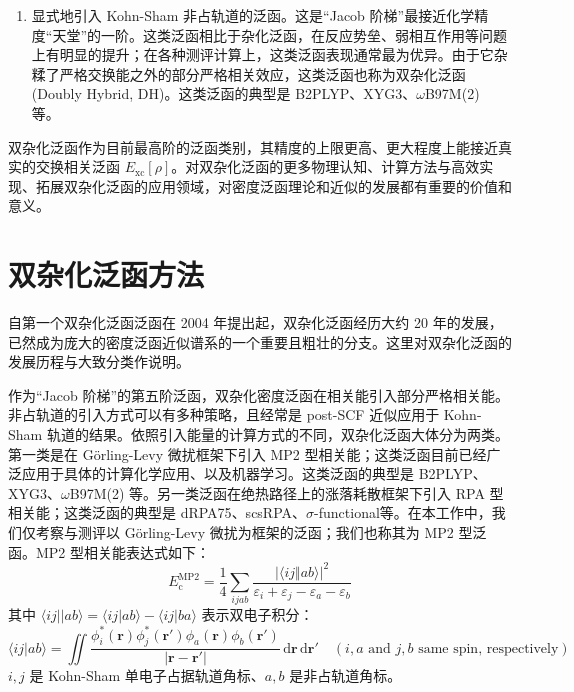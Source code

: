 \begin{enumerate}[nosep]
  \item 显式地引入 Kohn-Sham 非占轨道的泛函。这是“Jacob 阶梯”最接近化学精度“天堂”的一阶。这类泛函相比于杂化泛函，在反应势垒、弱相互作用等问题上有明显的提升；在各种测评计算上，这类泛函表现通常最为优异。由于它杂糅了严格交换能之外的部分严格相关效应，这类泛函也称为双杂化泛函 (Doubly Hybrid, DH)。这类泛函的典型是 B2PLYP\cite{Grimme-Grimme.JCP.2006}、XYG3\cite{Zhang-Goddard.PNAS.2009}、$\omega$B97M(2)\cite{Mardirossian-Head-Gordon.JCP.2018} 等。
\end{enumerate}

双杂化泛函作为目前最高阶的泛函类别，其精度的上限更高、更大程度上能接近真实的交换相关泛函 $E_\mathrm{xc}[\rho]$。对双杂化泛函的更多物理认知、计算方法与高效实现、拓展双杂化泛函的应用领域，对密度泛函理论和近似的发展都有重要的价值和意义。

\section{双杂化泛函方法}

自第一个双杂化泛函泛函在 2004 年提出起\cite{Zhao-Truhlar.JPCA.2004}，双杂化泛函经历大约 20 年的发展，已然成为庞大的密度泛函近似谱系的一个重要且粗壮的分支。这里对双杂化泛函的发展历程与大致分类作说明。

作为“Jacob 阶梯”的第五阶泛函，双杂化密度泛函在相关能引入部分严格相关能。非占轨道的引入方式可以有多种策略，且经常是 post-SCF 近似应用于 Kohn-Sham 轨道的结果。依照引入能量的计算方式的不同，双杂化泛函大体分为两类。第一类是在 G\"{o}rling-Levy 微扰框架\cite{Goerling-Levy.PRB.1993, Goerling-Levy.PRA.1994}下引入 MP2 型相关能；这类泛函目前已经广泛应用于具体的计算化学应用、以及机器学习。这类泛函的典型是 B2PLYP\cite{Grimme-Grimme.JCP.2006}、XYG3\cite{Zhang-Goddard.PNAS.2009}、$\omega$B97M(2)\cite{Mardirossian-Head-Gordon.JCP.2018} 等。另一类泛函在绝热路径上的涨落耗散框架\cite{Langreth-Perdew.SSC.1975, Langreth-Perdew.PRB.1977, Goerling-Goerling.PRB.2019}下引入 RPA 型相关能；这类泛函的典型是 dRPA75\cite{Mezei-Kallay.JCTC.2015}、scsRPA\cite{Zhang-Xu.JPCL.2019}、$\sigma$-functional\cite{Trushin-Goerling.JCP.2021}等。在本工作中，我们仅考察与测评以 G\"{o}rling-Levy 微扰为框架的泛函；我们也称其为 MP2 型泛函。MP2 型相关能表达式如下：
\begin{equation}
  E_\mathrm{c}^\mathrm{MP2} = \frac{1}{4} \sum_{ijab} \frac{\big| \langle ij \Vert ab \rangle \big|^2}{\varepsilon_i + \varepsilon_j - \varepsilon_a - \varepsilon_b}
\end{equation}
其中 $\langle ij || ab \rangle = \langle ij | ab \rangle - \langle ij | ba \rangle$ 表示双电子积分：
\begin{equation}
  \langle ij | ab \rangle = \iint \frac{\phi_i^*(\bm{r}) \phi_j^*(\bm{r}') \phi_a(\bm{r}) \phi_b(\bm{r}')}{|\bm{r} - \bm{r}'|} \, \mathrm{d} \bm{r} \, \mathrm{d} \bm{r}' \quad (i, a \text{ and } j, b \text{ same spin, respectively})
\end{equation}
$i, j$ 是 Kohn-Sham 单电子占据轨道角标、$a, b$ 是非占轨道角标。

